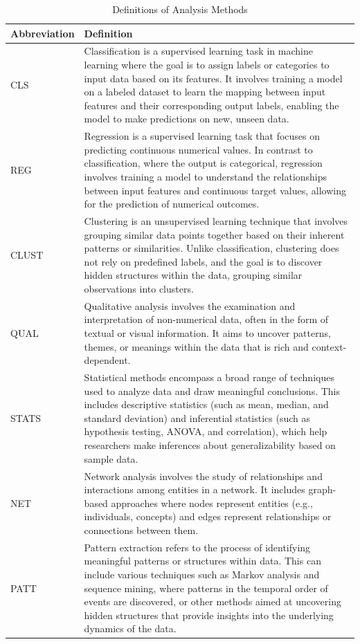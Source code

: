 \documentclass[manuscript,screen,review]{acmart}
\begin{document}
\begin{table}[ht]
\centering
\caption{Definitions of Analysis Methods}
\begin{tabular}{|l|p{}|}
\hline
\textbf{Abbreviation} & \textbf{Definition} \\
\hline
CLS & Classification is a supervised learning task in machine learning where the goal is to assign labels or categories to input data based on its features. It involves training a model on a labeled dataset to learn the mapping between input features and their corresponding output labels, enabling the model to make predictions on new, unseen data. \\
\hline
REG & Regression is a supervised learning task that focuses on predicting continuous numerical values. In contrast to classification, where the output is categorical, regression involves training a model to understand the relationships between input features and continuous target values, allowing for the prediction of numerical outcomes. \\
\hline
CLUST & Clustering is an unsupervised learning technique that involves grouping similar data points together based on their inherent patterns or similarities. Unlike classification, clustering does not rely on predefined labels, and the goal is to discover hidden structures within the data, grouping similar observations into clusters. \\
\hline
QUAL & Qualitative analysis involves the examination and interpretation of non-numerical data, often in the form of textual or visual information. It aims to uncover patterns, themes, or meanings within the data that is rich and context-dependent. \\
\hline
STATS & Statistical methods encompass a broad range of techniques used to analyze data and draw meaningful conclusions. This includes descriptive statistics (such as mean, median, and standard deviation) and inferential statistics (such as hypothesis testing, ANOVA, and correlation), which help researchers make inferences about generalizability based on sample data. \\
\hline
NET & Network analysis involves the study of relationships and interactions among entities in a network. It includes graph-based approaches where nodes represent entities (e.g., individuals, concepts) and edges represent relationships or connections between them.  \\
\hline
PATT & Pattern extraction refers to the process of identifying meaningful patterns or structures within data. This can include various techniques such as Markov analysis and sequence mining, where patterns in the temporal order of events are discovered, or other methods aimed at uncovering hidden structures that provide insights into the underlying dynamics of the data. \\
\hline
\end{tabular}
\label{tab:analysis_methods}
\end{table}
\end{document}
